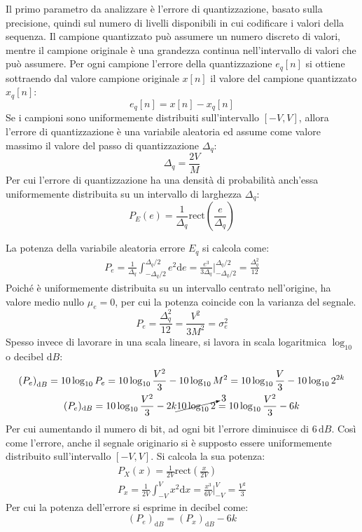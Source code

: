 \documentclass{article}
\newcommand{\rect}{\mathrm{rect}}
\newcommand{\df}{\mathrm{d}}
\numberwithin{equation}{subsection}
\begin{document}
Il primo parametro da analizzare è l'errore di quantizzazione, basato sulla precisione, quindi sul numero di livelli disponibili in cui 
codificare i valori della sequenza. 
Il campione quantizzato può assumere un numero discreto di valori, mentre il campione originale è una grandezza continua nell'intervallo di valori che può 
assumere. Per ogni campione l'errore della quantizzazione $e_q[n]$ si ottiene sottraendo dal valore campione originale $x[n]$ il valore del campione quantizzato $x_q[n]$: 
\begin{equation}
    e_q[n]=x[n]-x_q[n]
\end{equation}
Se i campioni sono uniformemente distribuiti sull'intervallo $[-V,V]$, allora l'errore di quantizzazione è una variabile aleatoria ed assume come valore massimo 
il valore del passo di quantizzazione $\Delta_q$:
\begin{equation}
    \Delta_q=\displaystyle\frac{2V}{M}
\end{equation}
Per cui l'errore di quantizzazione ha una densità di probabilità anch'essa uniformemente distribuita su un intervallo di larghezza $\Delta_q$:
\begin{equation}
    {P}_E(e)=\displaystyle\frac{1}{\Delta_q}\rect\left(\frac{e}{\Delta_q}\right)
\end{equation}

La potenza della variabile aleatoria errore $E_q$ si calcola come:
\begin{gather*}
    {P}_e=\displaystyle\frac{1}{\Delta_q}\int_{-\Delta_q /2}^{\Delta_q/2}e^2\df e=\frac{e^3}{3\Delta_q}\Bigg|_{-\Delta_q/2}^{\Delta_q/2}=\frac{\Delta_q^2}{12}
\end{gather*}
Poiché è uniformemente distribuita su un intervallo centrato nell'origine, ha valore medio nullo $\mu_e=0$, per cui la potenza coincide con la 
varianza del segnale. 
\begin{equation}
    P_e=\displaystyle\frac{\Delta_q^2}{12}=\frac{V^2}{3M^2}=\sigma_e^2
\end{equation}
Spesso invece di lavorare in una scala lineare, si lavora in scala logaritmica $\log_{10}$ o decibel $\df B$:
\begin{gather*}
    \left(P_e\right)_{\df B}=10\log_{10}P_e=10\log_{10}\displaystyle\frac{V^2}{3}-10\log_{10}M^2=10\log_{10}\displaystyle\frac{V}{3}-10\log_{10}2^{2k}\\
    (P_e)_{\df B}=10\log_{10}\displaystyle\frac{V^2}{3}-2k\cancelto{3}{10\log_{10}2}=10\log_{10}\displaystyle\frac{V^2}{3}-6k
\end{gather*}
Per cui aumentando il numero di bit, ad ogni bit l'errore diminuisce di $6\,\df B$. Così come l'errore, anche il 
segnale originario si è supposto essere uniformemente distribuito sull'intervallo $[-V,V]$. Si calcola la sua potenza:
\begin{gather*}
    P_X(x)=\displaystyle\frac{1}{2V}\rect\left(\frac{x}{2V}\right)\\
    P_x=\displaystyle\frac{1}{2V}\int_{-V}^{V}x^2\df x=\frac{x^3}{6V}\Bigg|_{-V}^V=\frac{V^2}{3}
\end{gather*}
Per cui la potenza dell'errore si esprime in decibel come:
\begin{equation}
    (P_e)_{\df B}=(P_x)_{\df B}-6k
\end{equation}
\end{document}
